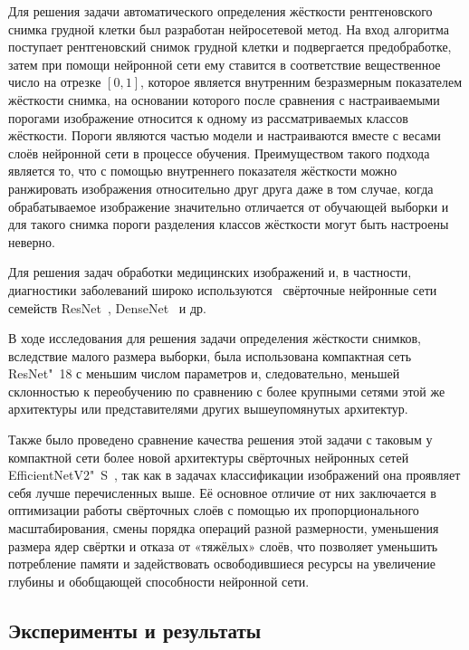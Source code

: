Для решения задачи автоматического определения жёсткости рентгеновского снимка грудной клетки был разработан нейросетевой метод. На вход алгоритма поступает рентгеновский снимок грудной клетки и подвергается предобработке, затем при помощи нейронной сети ему ставится в соответствие вещественное число на отрезке $\left[0, 1\right]$, которое является внутренним безразмерным показателем жёсткости снимка, на основании которого после сравнения с настраиваемыми порогами изображение относится к одному из рассматриваемых классов жёсткости.  Пороги являются частью модели и настраиваются вместе с весами слоёв нейронной сети в процессе обучения. Преимуществом такого подхода является то, что с помощью внутреннего показателя жёсткости можно ранжировать изображения относительно друг друга даже в том случае, когда обрабатываемое изображение значительно отличается от обучающей выборки и для такого снимка пороги разделения классов жёсткости могут быть настроены неверно.

Для решения задач обработки медицинских изображений и, в частности, диагностики заболеваний широко используются~\cite{oloko2022systematic} свёрточные нейронные сети семейств ResNet~\cite{he2016deep}, DenseNet~\cite{huang2017densely} и др.

В ходе исследования для решения задачи определения жёсткости снимков, вследствие малого размера выборки, была использована компактная сеть ResNet"~18 с меньшим числом параметров и, следовательно, меньшей склонностью к переобучению по сравнению с более крупными сетями этой же архитектуры или представителями других вышеупомянутых архитектур.

Также было проведено сравнение качества решения этой задачи с таковым у компактной сети более новой архитектуры свёрточных нейронных сетей EfficientNetV2"~S~\cite{tan2021efficientnetv2}, так как в задачах классификации изображений она проявляет себя лучше перечисленных выше. Её основное отличие от них заключается в оптимизации работы свёрточных слоёв с помощью их пропорционального масштабирования, смены порядка операций разной размерности, уменьшения размера ядер свёртки и отказа от «тяжёлых» слоёв, что позволяет уменьшить потребление памяти и задействовать освободившиеся ресурсы на увеличение глубины и обобщающей способности нейронной сети.

\subsection{Эксперименты и результаты} \label{subsec:tb-hardness-experiments}

